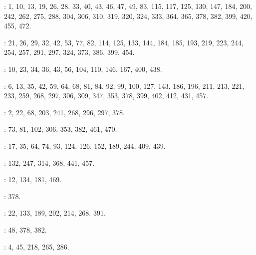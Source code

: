 \begin{small}\noindent {} : 1, 10, 13, 19, 26, 28, 33, 40, 43, 46, 47, 49, 83, 115, 117, 125, 130, 147, 184, 200, 242, 262, 275, 288, 304, 306, 310, 319, 320, 324, 333, 364, 365, 378, 382, 399, 420, 455, 472.\par\noindent {} : 21, 26, 29, 32, 42, 53, 77, 82, 114, 125, 133, 144, 184, 185, 193, 219, 223, 244, 254, 257, 291, 297, 324, 373, 386, 399, 454.\par\noindent {} : 10, 23, 34, 36, 43, 56, 104, 110, 146, 167, 400, 438.\par\noindent {} : 6, 13, 35, 42, 59, 64, 68, 81, 84, 92, 99, 100, 127, 143, 186, 196, 211, 213, 221, 233, 259, 268, 297, 306, 309, 347, 353, 378, 399, 402, 412, 431, 457.\par\noindent {} : 2, 22, 68, 203, 241, 268, 296, 297, 378.\par\noindent {} : 73, 81, 102, 306, 353, 382, 461, 470.\par\noindent {} : 17, 35, 64, 74, 93, 124, 126, 152, 189, 244, 409, 439.\par\noindent {} : 132, 247, 314, 368, 441, 457.\par\noindent {} : 12, 134, 181, 469.\par\noindent {} : 378.\par\noindent {} : 22, 133, 189, 202, 214, 268, 391.\par\noindent {} : 48, 378, 382.\par\noindent {} : 4, 45, 218, 265, 286.\end{small}
